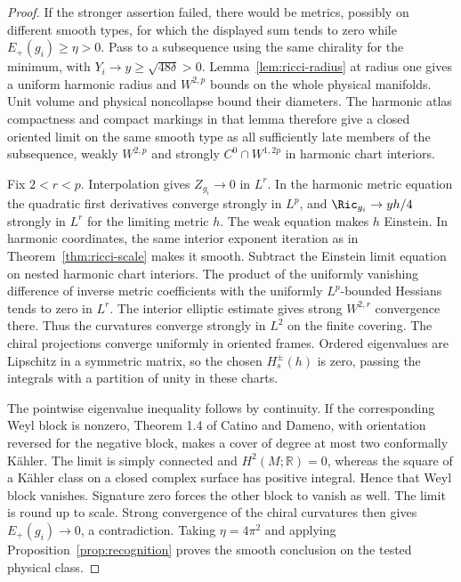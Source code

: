 \begin{proof}
If the stronger assertion failed, there would be metrics, possibly on
different smooth types, for which the displayed sum tends to zero
while \(E_+(g_i)\ge\eta>0\). Pass to a subsequence using the same
chirality for the minimum, with \(Y_i\to y\ge\sqrt{48\delta}>0\).
Lemma~\ref{lem:ricci-radius} at radius one gives a uniform harmonic
radius and \(W^{2,p}\) bounds on the whole physical manifolds.
Unit volume and physical noncollapse bound their diameters.
The harmonic atlas compactness and compact markings in that lemma
therefore give a closed oriented limit on the same smooth type as all
sufficiently late members of the subsequence, weakly \(W^{2,p}\) and
strongly \(C^0\cap W^{1,2p}\) in harmonic chart interiors.

Fix \(2<r<p\). Interpolation gives \(Z_{g_i}\to0\) in \(L^r\).
In the harmonic metric equation the quadratic first derivatives
converge strongly in \(L^p\), and \(\Ric_{g_i}\to yh/4\) strongly in
\(L^r\) for the limiting metric \(h\). The weak equation makes \(h\) Einstein. In harmonic coordinates, the same interior exponent iteration as in Theorem~\ref{thm:ricci-scale} makes it smooth.
Subtract the Einstein limit equation on nested harmonic chart interiors.
The product of the uniformly vanishing difference of inverse metric
coefficients with the uniformly \(L^p\)-bounded Hessians tends to zero
in \(L^r\). The interior elliptic estimate gives strong \(W^{2,r}\)
convergence there. Thus the curvatures converge strongly in \(L^2\)
on the finite covering. The chiral projections converge uniformly in
oriented frames. Ordered eigenvalues are Lipschitz in a symmetric
matrix, so the chosen \(H_s^\pm(h)\) is zero, passing the integrals
with a partition of unity in these charts.

The pointwise eigenvalue inequality follows by continuity. If the
corresponding Weyl block is nonzero, Theorem 1.4 of Catino and Dameno,
with orientation reversed for the negative block, makes a cover of
degree at most two conformally K\"ahler. The limit is simply connected
and \(H^2(M;\mathbb R)=0\), whereas the square of a K\"ahler class on a
closed complex surface has positive integral. Hence that Weyl block
vanishes. Signature zero forces the other block to vanish as well.
The limit is round up to scale. Strong convergence of the chiral
curvatures then gives \(E_+(g_i)\to0\), a contradiction. Taking
\(\eta=4\pi^2\) and applying Proposition~\ref{prop:recognition} proves
the smooth conclusion on the tested physical class.
\end{proof}
